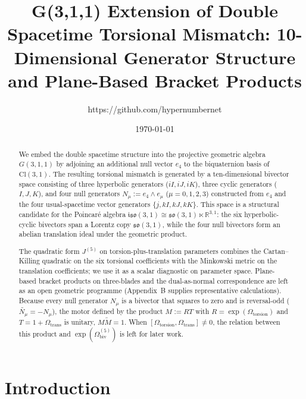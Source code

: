 \documentclass[dvipdfmx,a4paper]{article}
\title{G(3,1,1) Extension of Double Spacetime Torsional Mismatch: 10-Dimensional Generator Structure and Plane-Based Bracket Products}
\author{https://github.com/hypernumbernet}
\date{\today}
\theoremstyle{definition}
\theoremstyle{plain}
\theoremstyle{remark}
\begin{document}
\maketitle

\begin{abstract}
We embed the double spacetime structure into the projective geometric algebra \(G(3,1,1)\) by adjoining an additional null vector \(e_{4}\) to the biquaternion basis of \(\mathrm{Cl}(3,1)\). The resulting torsional mismatch is generated by a ten-dimensional bivector space consisting of three hyperbolic generators (\(iI, iJ, iK\)), three cyclic generators (\(I, J, K\)), and four null generators \(N_{\mu} := e_{4}\wedge e_{\mu}\) (\(\mu=0,1,2,3\)) constructed from \(e_{4}\) and the four usual-spacetime vector generators \(\{j, kI, kJ, kK\}\). This space is a structural candidate for the Poincar\'{e} algebra \(\mathfrak{iso}(3,1)\cong\mathfrak{so}(3,1)\ltimes\mathbb{R}^{3,1}\): the six hyperbolic-cyclic bivectors span a Lorentz copy \(\mathfrak{so}(3,1)\), while the four null bivectors form an abelian translation ideal under the geometric product.

The quadratic form \(J^{(5)}\) on torsion-plus-translation parameters combines the Cartan--Killing quadratic on the six torsional coefficients with the Minkowski metric on the translation coefficients; we use it as a scalar diagnostic on parameter space. Plane-based bracket products on three-blades and the dual-as-normal correspondence are left as an open geometric programme (Appendix~B supplies representative calculations). Because every null generator \(N_{\mu}\) is a bivector that squares to zero and is reversal-odd (\(\widetilde{N_{\mu}}=-N_{\mu}\)), the motor defined by the product \(M:=RT\) with \(R=\exp(\Omega_{\mathrm{torsion}})\) and \(T=1+\Omega_{\mathrm{trans}}\) is unitary, \(M\widetilde{M}=1\). When \([\Omega_{\mathrm{torsion}},\Omega_{\mathrm{trans}}]\neq 0\), the relation between this product and \(\exp(\Omega_{\mathrm{biv}}^{(5)})\) is left for later work.
\end{abstract}
 
\section{Introduction}
\label{sec:introduction}
\end{document}
